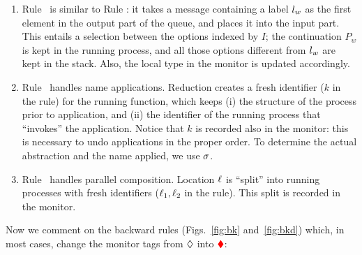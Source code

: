 \documentclass[runningheads]{llncs}
\newcommand{\todo}[1]{\textcolor{red}{TO DO:#1}}
\newcommand{\erase}[1]{#1}
\begin{document}
\begin{enumerate}[$\fwcolor{\blacktriangleright}$]
\item 
\erase{Rule~ is similar to Rule \fwcolor{\textsc{(Sel)}}: it takes a message containing a label $l_w$ as the first element in the output part of the queue, and places it into the input part. This entails a selection between the options indexed by $I$; the continuation $P_w$ is kept in the running process, and all those options different from $l_w$ are kept in the stack. Also, the local type in the monitor is updated accordingly.
}
\item Rule~ handles name applications. Reduction  creates a fresh identifier ($k$ in the rule) for the running function, which keeps (i) the structure of the process prior to application, and (ii) the identifier of the running process that ``invokes'' the application. Notice that $k$ is recorded also in the monitor: this is necessary to undo applications in the proper order. To determine the actual abstraction and the name applied, we use   $\sigma$.

\item Rule~ handles parallel composition. Location $\ell$ is ``split'' into running processes with fresh identifiers ($\ell_1, \ell_2$ in the rule). This split is recorded in the   monitor.
\end{enumerate}



\noindent
Now we comment on the backward rules (Figs.~\ref{fig:bk} and~\ref{fig:bkd}) which, in most cases, change the monitor tags from $\lozenge$ into $\textcolor{red}{\blacklozenge}$:
\end{document}

